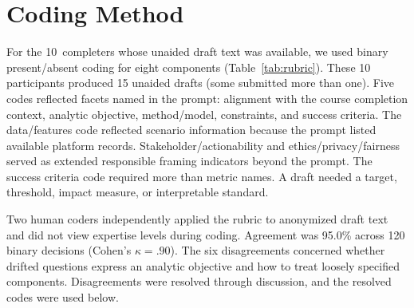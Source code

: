 \documentclass[sigconf,screen,anonymous]{acmart}
\begin{document}
\section{Coding Method}
For the 10~completers whose unaided draft text was available, we used binary present/absent coding for eight components (Table~\ref{tab:rubric}). These 10 participants produced 15 unaided drafts (some submitted more than one). Five codes reflected facets named in the prompt: alignment with the course completion context, analytic objective, method/model, constraints, and success criteria. The data/features code reflected scenario information because the prompt listed available platform records. Stakeholder/actionability and ethics/privacy/fairness served as extended responsible framing indicators beyond the prompt. The success criteria code required more than metric names. A draft needed a target, threshold, impact measure, or interpretable standard.

Two human coders independently applied the rubric to anonymized draft text and did not view expertise levels during coding. Agreement was 95.0\% across 120 binary decisions (Cohen's $\kappa=.90$). The six disagreements concerned whether drifted questions express an analytic objective and how to treat loosely specified components. Disagreements were resolved through discussion, and the resolved codes were used below.
\end{document}
